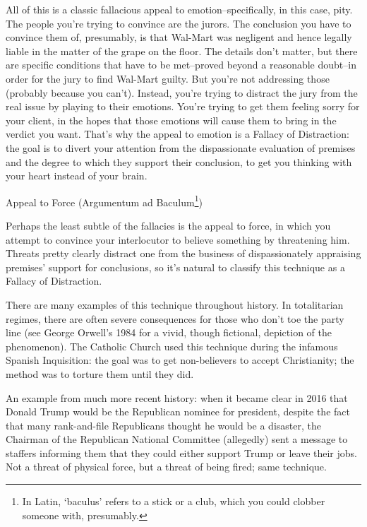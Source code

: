 All of this is a classic fallacious appeal to emotion--specifically, in this case, pity. The people
you're trying to convince are the jurors. The conclusion you have to convince them of, presumably,
is that Wal-Mart was negligent and hence legally liable in the matter of the grape on the floor. The
details don't matter, but there are specific conditions that have to be met--proved beyond a
reasonable doubt--in order for the jury to find Wal-Mart guilty. But you're not addressing those
(probably because you can't). Instead, you're trying to distract the jury from the real issue by
playing to their emotions. You're trying to get them feeling sorry for your client, in the hopes that
those emotions will cause them to bring in the verdict you want. That's why the appeal to emotion
is a Fallacy of Distraction: the goal is to divert your attention from the dispassionate evaluation of
premises and the degree to which they support their conclusion, to get you thinking with your heart
instead of your brain.

Appeal to Force (Argumentum ad Baculum\footnote{In Latin, `baculus' refers to a stick or a club, 
which you could clobber someone with, presumably.})

Perhaps the least subtle of the fallacies is the appeal to force, in which you attempt to convince
your interlocutor to believe something by threatening him. Threats pretty clearly distract one from
the business of dispassionately appraising premises' support for conclusions, so it's natural to
classify this technique as a Fallacy of Distraction.

There are many examples of this technique throughout history. In totalitarian regimes, there are
often severe consequences for those who don't toe the party line (see George Orwell's 1984 for a
vivid, though fictional, depiction of the phenomenon). The Catholic Church used this technique
during the infamous Spanish Inquisition: the goal was to get non-believers to accept Christianity;
the method was to torture them until they did.

An example from much more recent history: when it became clear in 2016 that Donald Trump
would be the Republican nominee for president, despite the fact that many rank-and-file
Republicans thought he would be a disaster, the Chairman of the Republican National Committee
(allegedly) sent a message to staffers informing them that they could either support Trump or leave
their jobs. Not a threat of physical force, but a threat of being fired; same technique.

